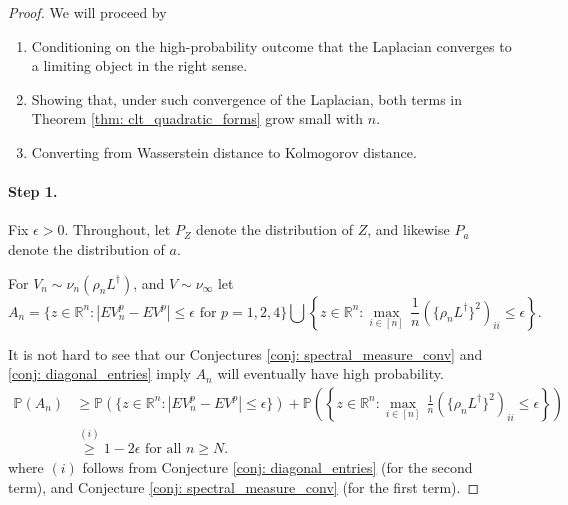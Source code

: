 \documentclass{article}
\newcommand{\Prob}[1]{\mathbb{P}\left( #1 \right)}
\newcommand{\abs}[1]{\left \lvert #1 \right \rvert}
\newcommand{\set}[1]{\left\{#1\right\}}
\newcommand{\Linv}{L^{\dagger}}
\theoremstyle{alden}
\theoremstyle{definition}
\theoremstyle{remark}
\begin{document}
\begin{proof}
	We will proceed by
	\begin{enumerate}
		\item Conditioning on the high-probability outcome that the Laplacian converges to a limiting object in the right sense.
		\item Showing that, under such convergence of the Laplacian, both terms in Theorem \ref{thm: clt_quadratic_forms} grow small with $n$.
		\item Converting from Wasserstein distance to Kolmogorov distance. 
	\end{enumerate}

	\paragraph{Step 1.}
	Fix $\epsilon > 0$. Throughout, let $P_Z$ denote the distribution of $Z$, and likewise $P_a$ denote the distribution of $a$.
	
	For  $V_n \sim \nu_n(\rho_n \Linv)$, and $V \sim \nu_{\infty}$ let
	\begin{equation*}
	A_n = \biggl \{z \in \mathbb{R}^n: \abs{ E V_n^p - E V^p } \leq \epsilon \text{ for } p = 1, 2, 4 \biggr \} \bigcup \set{ z \in \mathbb{R}^n: \underset{i \in [n]}{\max} \, \frac{1}{n} \left(\{ \rho_n \Linv\}^2 \right)_{ii} \leq \epsilon}.
	\end{equation*}
	
	It is not hard to see that our Conjectures \ref{conj: spectral_measure_conv} and \ref{conj: diagonal_entries} imply $A_n$ will eventually have high probability.
	\begin{align}
	\label{eqn: good_event_probability}
	\Prob{A_n} & \geq \Prob{\biggl \{z \in \mathbb{R}^n: \abs{ E V_n^p - E V^p } \leq \epsilon \biggr \}} + \Prob{\set{ z \in \mathbb{R}^n: \underset{i \in [n]}{\max} \, \frac{1}{n} \left(\{ \rho_n \Linv\}^2 \right)_{ii} \leq \epsilon}} \nonumber \\
	& \overset{(i)}{\geq} 1 - 2 \epsilon \text{ for all } n \geq N.
	\end{align}
	where $(i)$ follows from Conjecture \ref{conj: diagonal_entries} (for the second term), and Conjecture \ref{conj: spectral_measure_conv} (for the first term).
	

\end{proof}
\end{document}
